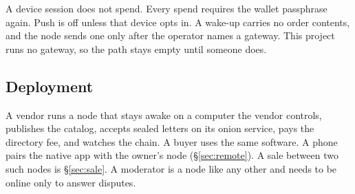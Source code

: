 A device session does not spend. Every spend requires the wallet passphrase again. Push is off unless that device opts in. A wake-up carries no order contents, and the node sends one only after the operator names a gateway. This project runs no gateway, so the path stays empty until someone does.

\subsection{Deployment}

A vendor runs a node that stays awake on a computer the vendor controls, publishes the catalog, accepts sealed letters on its onion service, pays the directory fee, and watches the chain. A buyer uses the same software. A phone pairs the native app with the owner's node (\S\ref{sec:remote}). A sale between two such nodes is \S\ref{sec:sale}. A moderator is a node like any other and needs to be online only to answer disputes.
